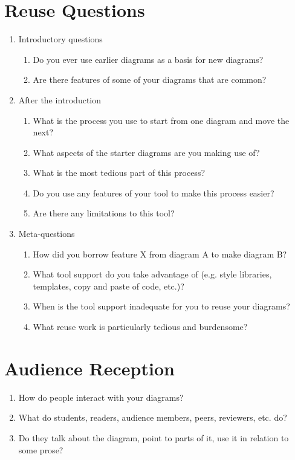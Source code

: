 \section{Reuse Questions}
\begin{enumerate}
    \item Introductory questions
    \begin{enumerate}
        \item Do you ever use earlier diagrams as a basis for new diagrams?
        \item Are there features of some of your diagrams that are common?
    \end{enumerate}
    \item After the introduction
    \begin{enumerate}
        \item What is the process you use to start from one diagram and move the next?
        \item What aspects of the starter diagrams are you making use of?
        \item What is the most tedious part of this process?
        \item Do you use any features of your tool to make this process easier?
        \item Are there any limitations to this tool?
    \end{enumerate}
    \item Meta-questions
    \begin{enumerate}
        \item How did you borrow feature X from diagram A to make diagram B?
        \item What tool support do you take advantage of (e.g. style libraries, templates, copy and paste of code, etc.)?
        \item When is the tool support inadequate for you to reuse your diagrams?
        \item What reuse work is particularly tedious and burdensome?
    \end{enumerate}
\end{enumerate}

\section{Audience Reception}
\begin{enumerate}
    \item How do people interact with your diagrams?
    \item What do students, readers, audience members, peers, reviewers, etc. do?
    \item Do they talk about the diagram, point to parts of it, use it in relation to some prose?
\end{enumerate}
